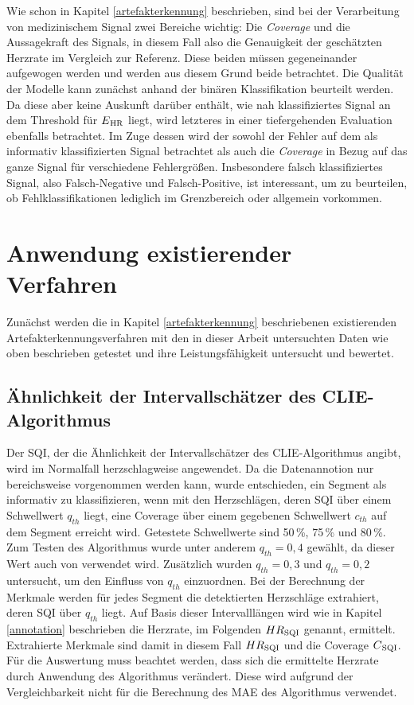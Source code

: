 Wie schon in Kapitel \ref{artefakterkennung} beschrieben, sind bei der Verarbeitung von medizinischem Signal zwei Bereiche wichtig: Die \textit{Coverage} und die Aussagekraft des Signals, in diesem Fall also die Genauigkeit der geschätzten Herzrate im Vergleich zur Referenz. Diese beiden müssen gegeneinander aufgewogen werden und werden aus diesem Grund beide betrachtet. Die Qualität der Modelle kann zunächst anhand der binären Klassifikation beurteilt werden. Da diese aber keine Auskunft darüber enthält, wie nah klassifiziertes Signal an dem Threshold für $E\textsubscript{HR}$ liegt, wird letzteres in einer tiefergehenden Evaluation ebenfalls betrachtet. Im Zuge dessen wird der sowohl der Fehler auf dem als informativ klassifizierten Signal betrachtet als auch die \textit{Coverage} in Bezug auf das ganze Signal für verschiedene Fehlergrößen. Insbesondere falsch klassifiziertes Signal, also Falsch-Negative und Falsch-Positive, ist interessant, um zu beurteilen, ob Fehlklassifikationen lediglich im Grenzbereich oder allgemein vorkommen.

\section{Anwendung existierender Verfahren}

Zunächst werden die in Kapitel \ref{artefakterkennung} beschriebenen existierenden Artefakterkennungsverfahren mit den in dieser Arbeit untersuchten Daten wie oben beschrieben getestet und ihre Leistungsfähigkeit untersucht und bewertet.

\subsection{Ähnlichkeit der Intervallschätzer des CLIE-Algorithmus}

Der \ac{SQI}, der die Ähnlichkeit der Intervallschätzer des \ac{CLIE}-Algorithmus angibt, wird im Normalfall herzschlagweise angewendet. Da die Datenannotion nur bereichsweise vorgenommen werden kann, wurde entschieden, ein Segment als informativ zu klassifizieren, wenn mit den Herzschlägen, deren \ac{SQI} über einem Schwellwert $q_{th}$ liegt, eine Coverage über einem gegebenen Schwellwert $c_{th}$ auf dem Segment erreicht wird. Getestete Schwellwerte sind 50\,\%, 75\,\% und 80\,\%. Zum Testen des Algorithmus wurde unter anderem $q_{th} = 0{,}4$ gewählt, da dieser Wert auch von \citeauthor{Zink2017} verwendet wird. Zusätzlich wurden $q_{th} = 0{,}3$ und $q_{th} = 0{,}2$ untersucht, um den Einfluss von $q_{th}$ einzuordnen. Bei der Berechnung der Merkmale werden für jedes Segment die detektierten Herzschläge extrahiert, deren \ac{SQI} über $q_{th}$ liegt. Auf Basis dieser Intervalllängen wird wie in Kapitel \ref{annotation} beschrieben die Herzrate, im Folgenden $HR\textsubscript{SQI}$ genannt, ermittelt. Extrahierte Merkmale sind damit in diesem Fall $HR\textsubscript{SQI}$ und die Coverage $C\textsubscript{SQI}$. Für die Auswertung muss beachtet werden, dass sich die ermittelte Herzrate durch Anwendung des Algorithmus verändert. Diese wird aufgrund der Vergleichbarkeit nicht für die Berechnung des \ac{MAE} des Algorithmus verwendet.

